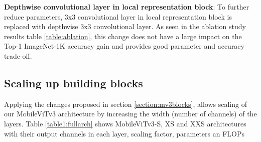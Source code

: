 \documentclass{article} \usepackage{iclr2022_conference,times}
\begin{document}
\textbf{Depthwise convolutional layer in local representation block}: 
To further reduce parameters, 3x3 convolutional layer in local representation block is replaced with depthwise 3x3 convolutional layer.
As seen in the ablation study results table \ref{table:ablation}, this change does not have a large impact on the Top-1 ImageNet-1K accuracy gain and provides good parameter and accuracy trade-off.



\subsection{Scaling up building blocks} \label{section:scaleup}

Applying the changes proposed in section \ref{section:mv3blocks}, allows scaling of our MobileViTv3 architecture by increasing the width (number of channels) of the layers.
Table \ref{table1:fullarch} shows MobileViTv3-S, XS and XXS architectures with their output channels in each layer, scaling factor, parameters an FLOPs
\end{document}
